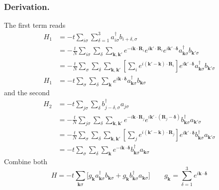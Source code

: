 \documentclass[../../../main.tex]{subfiles}
\begin{document}
\subsubsection{Derivation.}
The first term reads
\begin{align*}
  H_1 & = -t \sum_{i\sigma}\sum_{\delta=1}^{3} a_{i\sigma}^\dagger b_{i+\delta,\sigma}                                                                                                                                                         \\
      & = -\frac{t}{N}\sum_{i\sigma}\sum_{\delta}\sum_{\mathbf{k},\mathbf{k}'} e^{-i\mathbf{k}\cdot\mathbf{R}_i} e^{i\mathbf{k}'\cdot\mathbf{R}_i} e^{i\mathbf{k}'\cdot\boldsymbol{\delta}} a_{\mathbf{k}\sigma}^\dagger b_{\mathbf{k}'\sigma} \\
      & = -\frac{t}{N}\sum_{\sigma}\sum_{\delta}\sum_{\mathbf{k},\mathbf{k}'}\left[\sum_i e^{i(\mathbf{k}'-\mathbf{k})\cdot\mathbf{R}_i}\right] e^{i\mathbf{k}'\cdot\boldsymbol{\delta}}a_{\mathbf{k}\sigma}^\dagger b_{\mathbf{k}'\sigma}     \\
  H_1
      & = -t \sum_{\sigma}\sum_{\delta}\sum_{\mathbf{k}} e^{i\mathbf{k}\cdot\boldsymbol{\delta}} a_{\mathbf{k}\sigma}^{\dagger} b_{\mathbf{k}\sigma}
\end{align*}
and the second
\begin{align*}
  H_2 & = -t \sum_{j\sigma}\sum_{\delta} b_{j-\delta,\sigma}^{\dagger}a_{j\sigma}                                                                                                                                                             \\
      & = -\frac{t}{N}\sum_{j\sigma}\sum_{\delta}\sum_{\mathbf{k},\mathbf{k}'} e^{-i\mathbf{k}\cdot\mathbf{R}_j} e^{i\mathbf{k}'\cdot(\mathbf{R}_j-\boldsymbol{\delta})}  b^\dagger_{\mathbf{k}\sigma}  a_{\mathbf{k}'\sigma}                 \\
      & = -\frac{t}{N}\sum_{\sigma}\sum_{\delta}\sum_{\mathbf{k},\mathbf{k}'}\left[\sum_j e^{i(\mathbf{k}'-\mathbf{k})\cdot\mathbf{R}_j}\right] e^{i\mathbf{k}'\cdot\boldsymbol{\delta}}  b^\dagger_{\mathbf{k}\sigma}  a_{\mathbf{k}'\sigma} \\
      & = -t\sum_{\sigma}\sum_{\delta}\sum_{\mathbf{k}} e^{-i\mathbf{k}\cdot\boldsymbol{\delta}}  b^\dagger_{\mathbf{k}\sigma}  a_{\mathbf{k}\sigma}
\end{align*}
Combine both
\begin{equation*}
  H = -t \sum_{\mathbf{k}\sigma} \big[ g_\mathbf{k} a_{\mathbf{k}\sigma}^{\dagger} b_{\mathbf{k}\sigma} + g_\mathbf{k} b_{\mathbf{k}\sigma}^{\dagger} a_{\mathbf{k}\sigma} \big]
  \qquad
  g_\mathbf{k} = \sum_{\delta=1}^{3} e^{i\mathbf{k}\cdot\boldsymbol{\delta}}
\end{equation*}
\end{document}
